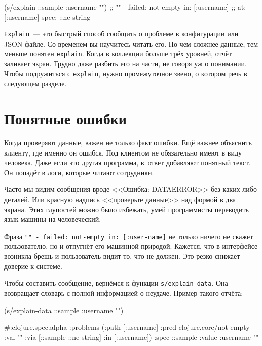 \begin{english}
  \begin{clojure}
(s/explain ::sample {:username ""})
;; "" - failed: not-empty in: [:username]
;; at: [:username] spec: ::ne-string
  \end{clojure}
\end{english}

\verb|Explain|~--- это быстрый способ сообщить о проблеме в конфигурации или
JSON-файле. Со временем вы научитесь читать его. Но чем сложнее данные, тем
меньше понятен \verb|explain|. Когда в коллекции больше трёх уровней,
отчёт заливает экран. Трудно даже разбить его на части, не говоря уж о
понимании. Чтобы подружиться с \verb|explain|, нужно промежуточное звено, о
котором речь в следующем разделе.

\section{Понятные ошибки}


\label{spec-messages}

Когда проверяют данные, важен не только факт ошибки. Ещё важнее объяснить
клиенту, где именно он ошибся. Под клиентом не обязательно имеют в виду
человека. Даже если это другая программа, в~ответ добавляют понятный текст. Он
попадёт в логи, которые читают сотрудники.

Часто мы видим сообщения вроде <<Ошибка: DATAERROR>> без каких-либо деталей. Или
красную надпись <<проверьте данные>> над формой в два экрана. Этих глупостей
можно было избежать, умей программисты переводить язык машины на человеческий.


Фраза \texttt{"" - failed: not-empty in: [:user-\-name]} не только ничего не скажет
пользователю, но и отпугнёт его машинной природой. Кажется, что в интерфейсе
возникла брешь и пользователь видит то, что не должен. Это резко снижает
доверие к системе.

Чтобы составить сообщение, вернёмся к функции \verb|s/explain-data|. Она
возвращает словарь с полной информацией о неудаче. Пример такого отчёта:

\begin{english}
  \begin{clojure}
(s/explain-data ::sample {:username ""})

#:clojure.spec.alpha
{:problems
 ({:path [:username]
   :pred clojure.core/not-empty
   :val ""
   :via [::sample ::ne-string]
   :in [:username]})
 :spec ::sample
 :value {:username ""}}
  \end{clojure}
\end{english}


